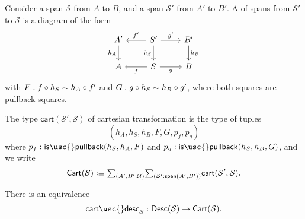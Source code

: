 \begin{defn}
Consider a span $\mathcal{S}$ from $A$ to $B$, and a span $\mathcal{S}'$ from $A'$ to $B'$. A  of spans from $\mathcal{S}'$ to $\mathcal{S}$ is a diagram of the form
\begin{equation*}
\begin{tikzcd}
A' \arrow[d,swap,"h_A"]  & S' \arrow[l,swap,"{f'}"] \arrow[r,"{g'}"] \arrow[d,swap,"h_S"] & B' \arrow[d,"h_B"] \\
A & S \arrow[l,"f"] \arrow[r,swap,"g"] & B
\end{tikzcd}
\end{equation*}
with $F:f\circ h_S\sim h_A\circ f'$ and $G:g\circ h_S\sim h_B\circ g'$, where both squares are pullback squares. 

The type $\mathsf{cart}(\mathcal{S}',\mathcal{S})$ of cartesian transformation is the type of tuples
\begin{equation*}
(h_A,h_S,h_B,F,G,p_f,p_g)
\end{equation*}
where $p_f:\mathsf{is\usc{}pullback}(h_S,h_A,F)$ and $p_g:\mathsf{is\usc{}pullback}(h_S,h_B,G)$, and we write
\begin{equation*}
\mathsf{Cart}(\mathcal{S}) \defeq \sm{A',B':\UU}{\mathcal{S}':\mathsf{span}(A',B')}\mathsf{cart}(\mathcal{S}',\mathcal{S}).
\end{equation*}
\end{defn}

\begin{lem}\label{lem:cart_desc}
There is an equivalence
\begin{equation*}
\mathsf{cart\usc{}desc}_{\mathcal{S}}:\mathsf{Desc}(\mathcal{S})\to \mathsf{Cart}(\mathcal{S}).
\end{equation*}
\end{lem}

